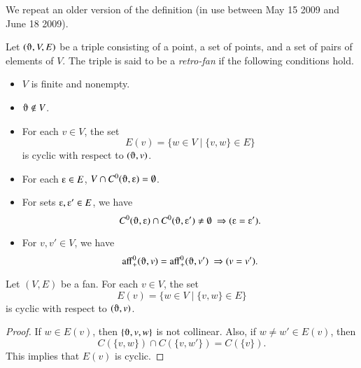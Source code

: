 \begin{note}%
We repeat an older version of the definition (in use between May 15 2009 and June 18 2009).
\begin{definition}  Let $(\orgn,V,E)$ be a triple consisting of a point,
a set of
points, and a set of pairs of elements of $V$.  The triple is said to be
a {\it retro-fan\/} if the following conditions hold.
    \begin{itemize}
    \item $V$ is finite and nonempty.
    \item $\orgn\not\in V$.
    \item For each $v\in V$, the set
        $$
        E(v) = \{w\in V\mid \{v,w\}\in E\}
        $$
        is cyclic with respect to $(\orgn,v)$.
    \item For each $\e\in E$, $V\cap C^0(\orgn,\e)=\emptyset$.
    \item For sets $\e,\e'\in E$,   we have
        $$C^0(\orgn,\e) \cap C^0(\orgn,\e')\ne\emptyset\ \Rightarrow (\e = \e').$$
    \item For $v,v'\in V$, we have
     $$\op{aff}^0_+(\orgn,v) = \op{aff}^0_+(\orgn,v')\ \Rightarrow (v=v').$$
    \end{itemize}
\end{definition}
\end{note}

\begin{lemma}  Let $(V,E)$ be a fan.
For each $v\in V$, the set
        $$
        E(v) = \{w\in V\mid \{v,w\}\in E\}
        $$
        is cyclic with respect to $(\orgn,v)$.
\end{lemma}

\begin{proof}  If $w\in E(v)$, then $\{\orgn,v,w\}$ is not collinear.
Also, if $w\ne w'\in E(v)$, then
$$
C(\{v,w\})\cap C(\{v,w'\}) = C(\{v\}).
$$
This implies that $E(v)$ is cyclic.
\end{proof}

